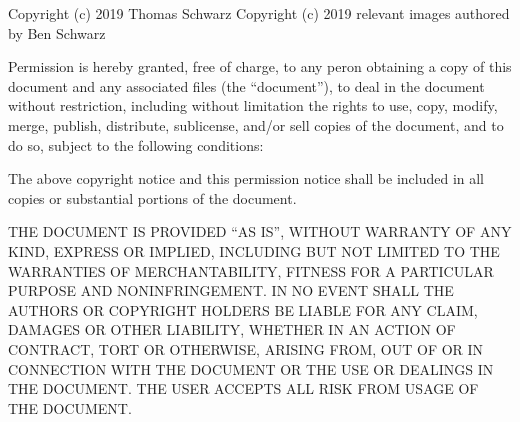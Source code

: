 \documentclass[11pt, titlepage]{article}
\begin{document}
Copyright (c) 2019 Thomas Schwarz
Copyright (c) 2019 relevant images authored by Ben Schwarz

Permission is hereby granted, free of charge, to any peron obtaining a copy of this document and any associated files (the ``document''), to deal in the document without restriction, including without limitation the rights to use, copy, modify, merge, publish, distribute, sublicense, and/or sell copies of the document, and to do so, subject to the following conditions:

The above copyright notice and this permission notice shall be included in all copies or substantial portions of the document.

THE DOCUMENT IS PROVIDED ``AS IS'', WITHOUT WARRANTY OF ANY KIND, EXPRESS OR IMPLIED, INCLUDING BUT NOT LIMITED TO THE WARRANTIES OF MERCHANTABILITY, FITNESS FOR A PARTICULAR PURPOSE AND NONINFRINGEMENT. IN NO EVENT SHALL THE AUTHORS OR COPYRIGHT HOLDERS BE LIABLE FOR ANY CLAIM, DAMAGES OR OTHER LIABILITY, WHETHER IN AN ACTION OF CONTRACT, TORT OR OTHERWISE, ARISING FROM, OUT OF OR IN CONNECTION WITH THE DOCUMENT OR THE USE OR DEALINGS IN THE DOCUMENT. THE USER ACCEPTS ALL RISK FROM USAGE OF THE DOCUMENT.
\end{document}
